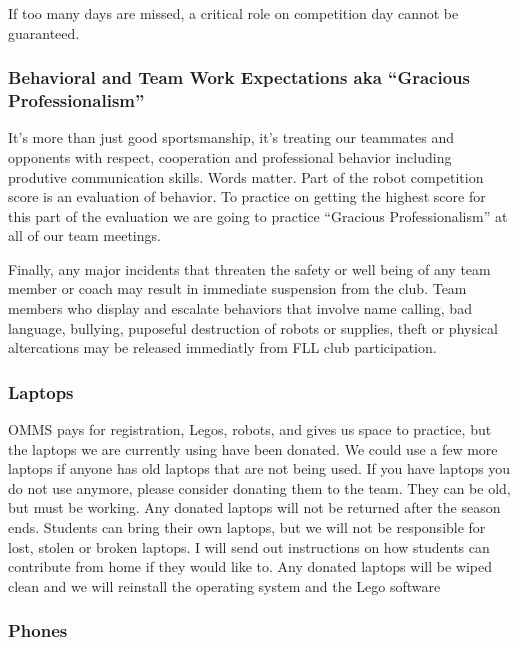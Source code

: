 \documentclass[letter]{article}
\begin{document}
If too many days are missed, a critical role on competition day cannot
be guaranteed.

\hypertarget{behavioral-and-team-work-expectations-aka-gracious-professionalism}{%
\subsubsection{Behavioral and Team Work Expectations aka ``Gracious
Professionalism''}\label{behavioral-and-team-work-expectations-aka-gracious-professionalism}}

It's more than just good sportsmanship, it's treating our teammates and
opponents with respect, cooperation and professional behavior including
produtive communication skills. Words matter. Part of the robot
competition score is an evaluation of behavior. To practice on getting
the highest score for this part of the evaluation we are going to
practice ``Gracious Professionalism'' at all of our team meetings.

Finally, any major incidents that threaten the safety or well being of
any team member or coach may result in immediate suspension from the
club. Team members who display and escalate behaviors that involve name
calling, bad language, bullying, puposeful destruction of robots or
supplies, theft or physical altercations may be released immediatly from
FLL club participation.

\hypertarget{laptops}{%
\subsubsection{Laptops}\label{laptops}}

OMMS pays for registration, Legos, robots, and gives us space to
practice, but the laptops we are currently using have been donated. We
could use a few more laptops if anyone has old laptops that are not
being used. If you have laptops you do not use anymore, please consider
donating them to the team. They can be old, but must be working. Any
donated laptops will not be returned after the season ends. Students can
bring their own laptops, but we will not be responsible for lost, stolen
or broken laptops. I will send out instructions on how students can
contribute from home if they would like to. Any donated laptops will be
wiped clean and we will reinstall the operating system and the Lego
software

\hypertarget{phones}{%
\subsubsection{Phones}\label{phones}}
\end{document}
